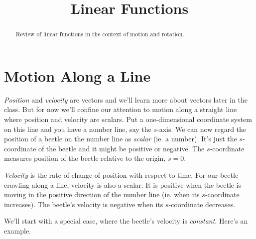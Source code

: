 \documentclass{ximera}
\title{Linear Functions}
\begin{document}
\begin{abstract}
Review of linear functions in the context of motion and rotation.
\end{abstract}
\maketitle


\section{Motion Along a Line}
\emph{Position} and \emph{velocity} are vectors and we'll learn more about vectors later in the class. But for now we'll confine our attention to motion along a straight line where position and velocity are scalars. Put a one-dimensional coordinate system on this line and you have a number line, say the $s$-axis. We can now regard the position of a beetle on the number line as \emph{scalar} (ie. a number). It's just the $s$-coordinate of the beetle and it might be positive or negative. The $s$-coordinate measures position of the beetle relative to the origin, $s=0$.

\emph{Velocity} is the rate of change of position with respect to time. For our beetle crawling along a line, velocity is also a scalar. It is positive when the beetle is moving in the positive direction of the number line (ie. when its $s$-coordinate increases). The beetle's velocity is negative when its $s$-coordinate decreases.

We'll start with a special case, where the beetle's velocity is \emph{constant}. Here's an example.
\end{document}
